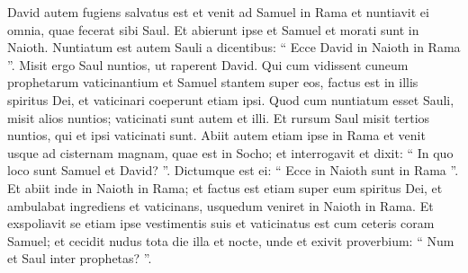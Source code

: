 \begin{biblechapter}
\begin{biblechapter}
\begin{biblechapter}
\begin{biblechapter}
\begin{biblechapter}
\begin{biblechapter}
\begin{biblechapter}
\begin{biblechapter}
\begin{biblechapter}
\begin{biblechapter}
\begin{biblechapter}
\begin{biblechapter}
\begin{biblechapter}
\begin{biblechapter}
\begin{biblechapter}
\begin{biblechapter}
\begin{biblechapter}
\begin{biblechapter}
\begin{biblechapter}
 \verse David autem fugiens salvatus est et venit ad Samuel in Rama et nuntiavit ei omnia, quae fecerat sibi Saul. Et abierunt ipse et Samuel et morati sunt in Naioth.
 \verse Nuntiatum est autem Sauli a dicentibus: “ Ecce David in Naioth in Rama ”. 
\verse Misit ergo Saul nuntios, ut raperent David. Qui cum vidissent cuneum prophetarum vaticinantium et Samuel stantem super eos, factus est in illis spiritus Dei, et vaticinari coeperunt etiam ipsi. 
\verse Quod cum nuntiatum esset Sauli, misit alios nuntios; vaticinati sunt autem et illi. Et rursum Saul misit tertios nuntios, qui et ipsi vaticinati sunt.
 \verse Abiit autem etiam ipse in Rama et venit usque ad cisternam magnam, quae est in Socho; et interrogavit et dixit: “ In quo loco sunt Samuel et David? ”. Dictumque est ei: “ Ecce in Naioth sunt in Rama ”. 
\verse Et abiit inde in Naioth in Rama; et factus est etiam super eum spiritus Dei, et ambulabat ingrediens et vaticinans, usquedum veniret in Naioth in Rama. 
\verse Et exspoliavit se etiam ipse vestimentis suis et vaticinatus est cum ceteris coram Samuel; et cecidit nudus tota die illa et nocte, unde et exivit proverbium: “ Num et Saul inter prophetas? ”.
 

\end{biblechapter}
\end{biblechapter}
\end{biblechapter}
\end{biblechapter}
\end{biblechapter}
\end{biblechapter}
\end{biblechapter}
\end{biblechapter}
\end{biblechapter}
\end{biblechapter}
\end{biblechapter}
\end{biblechapter}
\end{biblechapter}
\end{biblechapter}
\end{biblechapter}
\end{biblechapter}
\end{biblechapter}
\end{biblechapter}
\end{biblechapter}
